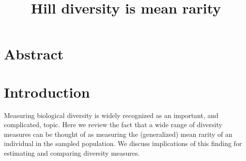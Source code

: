 \documentclass[12pt]{article}
\begin{document}
\title{Hill diversity is mean rarity}

\section*{Abstract}

\section{Introduction}

Measuring biological diversity is widely recognized as an important, and complicated, topic. Here we review the fact that a wide range of diversity measures can be thought of as measuring the (generalized) mean rarity of an individual in the sampled population. We discuss implications of this finding for estimating and comparing diversity measures.
\end{document}
